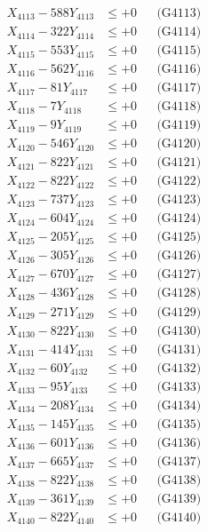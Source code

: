 \documentclass[a4paper,10pt]{article}
\begin{document}
{\begin{align}
X_{4113} - 588Y_{4113} &\leq +0 && \text{(G4113)} \\
X_{4114} - 322Y_{4114} &\leq +0 && \text{(G4114)} \\
X_{4115} - 553Y_{4115} &\leq +0 && \text{(G4115)} \\
X_{4116} - 562Y_{4116} &\leq +0 && \text{(G4116)} \\
X_{4117} - 81Y_{4117} &\leq +0 && \text{(G4117)} \\
X_{4118} - 7Y_{4118} &\leq +0 && \text{(G4118)} \\
X_{4119} - 9Y_{4119} &\leq +0 && \text{(G4119)} \\
X_{4120} - 546Y_{4120} &\leq +0 && \text{(G4120)} \\
\allowbreak
X_{4121} - 822Y_{4121} &\leq +0 && \text{(G4121)} \\
X_{4122} - 822Y_{4122} &\leq +0 && \text{(G4122)} \\
X_{4123} - 737Y_{4123} &\leq +0 && \text{(G4123)} \\
X_{4124} - 604Y_{4124} &\leq +0 && \text{(G4124)} \\
X_{4125} - 205Y_{4125} &\leq +0 && \text{(G4125)} \\
X_{4126} - 305Y_{4126} &\leq +0 && \text{(G4126)} \\
X_{4127} - 670Y_{4127} &\leq +0 && \text{(G4127)} \\
X_{4128} - 436Y_{4128} &\leq +0 && \text{(G4128)} \\
X_{4129} - 271Y_{4129} &\leq +0 && \text{(G4129)} \\
X_{4130} - 822Y_{4130} &\leq +0 && \text{(G4130)} \\
\allowbreak
X_{4131} - 414Y_{4131} &\leq +0 && \text{(G4131)} \\
X_{4132} - 60Y_{4132} &\leq +0 && \text{(G4132)} \\
X_{4133} - 95Y_{4133} &\leq +0 && \text{(G4133)} \\
X_{4134} - 208Y_{4134} &\leq +0 && \text{(G4134)} \\
X_{4135} - 145Y_{4135} &\leq +0 && \text{(G4135)} \\
X_{4136} - 601Y_{4136} &\leq +0 && \text{(G4136)} \\
X_{4137} - 665Y_{4137} &\leq +0 && \text{(G4137)} \\
X_{4138} - 822Y_{4138} &\leq +0 && \text{(G4138)} \\
X_{4139} - 361Y_{4139} &\leq +0 && \text{(G4139)} \\
X_{4140} - 822Y_{4140} &\leq +0 && \text{(G4140)} \\

\end{align}}
\end{document}
